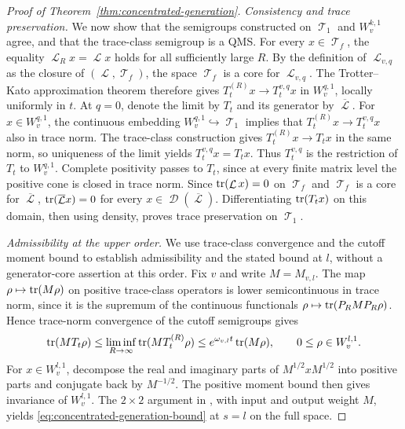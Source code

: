 \documentclass[11pt]{article}
\theoremstyle{myplain}
\theoremstyle{mydefinition}
\theoremstyle{remark}
\DeclareMathOperator{\cD}{\mathcal{D}}
\DeclareMathOperator{\cL}{\mathcal{L}}
\DeclareMathOperator{\cT}{\mathcal{T}}
\DeclareMathOperator{\1}{\mathds{1}}
\newcommand{\tr}[1][]{\operatorname{tr}%
  \ifx#1\empty \else \left[ #1 \right] \fi}
\begin{document}
\begin{proof}[Proof of Theorem~\ref{thm:concentrated-generation}]
        \emph{Consistency and trace preservation.} We now show that the semigroups constructed on $\cT_1$ and $W_v^{k,1}$ agree, and that the trace-class semigroup is a QMS. For every $x\in\cT_f$, the equality $\cL_Rx=\cL x$ holds for all sufficiently large $R$. By the definition of $\cL_{v,q}$ as the closure of $(\cL,\cT_f)$, the space $\cT_f$ is a core for $\cL_{v,q}$. The Trotter--Kato approximation theorem \cite[Thm.~III.4.8]{Engel.2000} therefore gives $T_t^{(R)}x\to T_t^{v,q}x$ in $W_v^{q,1}$, locally uniformly in $t$. At $q=0$, denote the limit by $T_t$ and its generator by $\overline{\cL}$. For $x\in W_v^{q,1}$, the continuous embedding $W_v^{q,1}\hookrightarrow\cT_1$ implies that $T_t^{(R)}x\to T_t^{v,q}x$ also in trace norm. The trace-class construction gives $T_t^{(R)}x\to T_tx$ in the same norm, so uniqueness of the limit yields $T_t^{v,q}x=T_tx$. Thus $T_t^{v,q}$ is the restriction of $T_t$ to $W_v^{q,1}$. Complete positivity passes to $T_t$, since at every finite matrix level the positive cone is closed in trace norm. Since $\tr(\cL x)=0$ on $\cT_f$ and $\cT_f$ is a core for $\overline{\cL}$, $\tr(\overline{\cL}x)=0$ for every $x\in\cD(\overline{\cL})$. Differentiating $\tr(T_tx)$ on this domain, then using density, proves trace preservation on $\cT_1$.

        \emph{Admissibility at the upper order.} We use trace-class convergence and the cutoff moment bound to establish admissibility and the stated bound at $l$, without a generator-core assertion at this order. Fix $v$ and write $M=M_{v,l}$. The map $\rho\mapsto\tr(M\rho)$ on positive trace-class operators is lower semicontinuous in trace norm, since it is the supremum of the continuous functionals $\rho\mapsto\tr(P_RMP_R\rho)$. Hence trace-norm convergence of the cutoff semigroups gives
        \begin{equation*}
            \tr(MT_t\rho)
            \leq\liminf_{R\to\infty}\tr(MT_t^{(R)}\rho)
            \leq e^{\omega_{v,l}t}\tr(M\rho),
            \qquad 0\leq\rho\in W_v^{l,1}.
        \end{equation*}
        For $x\in W_v^{l,1}$, decompose the real and imaginary parts of $M^{1/2}xM^{1/2}$ into positive parts and conjugate back by $M^{-1/2}$. The positive moment bound then gives invariance of $W_v^{l,1}$. The $2\times2$ argument in \cite[proof of Thm.~4.1.1]{Moebus.2025thesis}, with input and output weight $M$, yields \eqref{eq:concentrated-generation-bound} at $s = l$ on the full space.

      


\end{proof}
\end{document}
